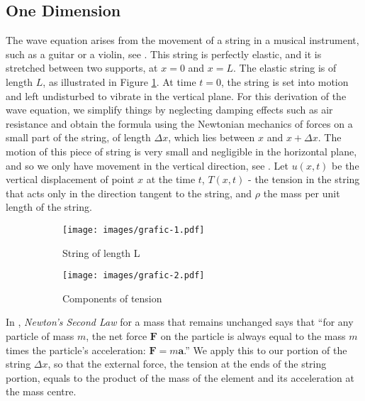 \documentclass[a4paper, 12pt]{article}
\numberwithin{equation}{section}
\begin{document}
\subsection{One Dimension}
The wave equation arises from the movement of a string in a musical instrument,
such as a guitar or a violin, see \cite[Ch. 10, App. B]{BoyDiP}. This string is
perfectly elastic, and it is stretched between two supports, at $x=0$ and $x=L$.
The elastic string is of length $L$, as illustrated in Figure \ref{fig:1a}. At
time $t=0$, the string is set into motion and left undisturbed to vibrate in the
vertical plane. For this derivation of the wave equation, we simplify things by
neglecting damping effects such as air resistance and obtain the formula using
the Newtonian mechanics of forces on a small part of the string, of length
$\Delta x$, which lies between $x$ and $x+\Delta x$. The motion of this piece of
string is very small and negligible in the horizontal plane, and so we only have
movement in the vertical direction, see \cite[Ch. 12.2]{Kr}. Let $u(x,t)$ be the
vertical displacement of point $x$ at the time $t$, $T(x,t)$ - the tension in
the string that acts only in the direction tangent to the string, and $\rho$ the
mass per unit length of the string. 

\begin{figure}[h] 
    \begin{subfigure}[t]{0.5\textwidth} 
        \texttt{[image: images/grafic-1.pdf]} 
        \caption{String of length L}
        \label{fig:1a}
    \end{subfigure} 
    \begin{subfigure}[t]{0.5\textwidth}
        \texttt{[image: images/grafic-2.pdf]}
        \caption{Components of tension}
        \label{fig:1b}
    \end{subfigure}     
\caption{}
\label{fig:1}
\end{figure}

In \cite[Ch. 1.4]{Tay}, \emph{Newton's Second Law} for a mass that remains
unchanged says that ``for any particle of mass $m$, the net force
$\boldsymbol{F}$ on the particle is always equal to the mass $m$ times the
particle's acceleration: $\boldsymbol{F} = m \boldsymbol{a}$.'' We apply this to
our portion of the string $\Delta x$, so that the external force, the tension at
the ends of the string portion, equals to the product of the mass of the element
and its acceleration at the mass centre. \\
\end{document}
